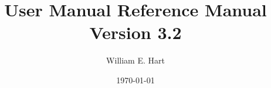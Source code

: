 \documentclass[pdf,12pt]{SANDreport}
\title{User Manual Reference Manual\\[1ex]\large Version 3.2}
\author{William E. Hart}		%
\date{\today}		%
\begin{document}
    \maketitle

    \begin{abstract}
    
    \end{abstract}


    \cleardoublepage		%
    \tableofcontents








    \SANDmain		%
\end{document}
